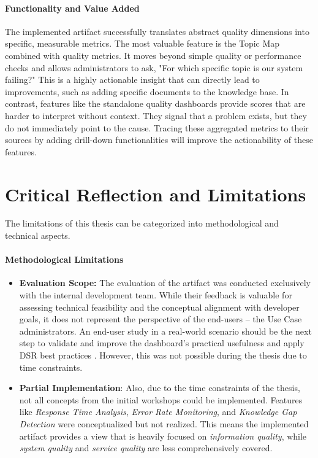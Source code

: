 \documentclass[
	english,
	ruledheaders=section,%
	class=report,%
	thesis={type=bachelor},%
	accentcolor=1b,%
	custommargins=true,%
	marginpar=false,%
	parskip=half-,%
	fontsize=11pt,%
	DIV=14,
]{tudapub}
\begin{document}
\paragraph{Functionality and Value Added} The implemented artifact successfully translates abstract quality dimensions into specific, measurable metrics. The most valuable feature is the Topic Map combined with quality metrics. It moves beyond simple quality or performance checks and allows administrators to ask, "For which specific topic is our system failing?" This is a highly actionable insight that can directly lead to improvements, such as adding specific documents to the knowledge base. In contrast, features like the standalone quality dashboards provide scores that are harder to interpret without context. They signal that a problem exists, but they do not immediately point to the cause. Tracing these aggregated metrics to their sources by adding drill-down functionalities will improve the actionability of these features.

\section{Critical Reflection and Limitations}
The limitations of this thesis can be categorized into methodological and technical aspects.

\paragraph{Methodological Limitations}
\begin{itemize}
    \item \textbf{Evaluation Scope:} The evaluation of the artifact was conducted exclusively with the internal development team. While their feedback is valuable for assessing technical feasibility and the conceptual alignment with developer goals, it does not represent the perspective of the end-users -- the Use Case administrators. An end-user study in a real-world scenario should be the next step to validate and improve the dashboard's practical usefulness and apply DSR best practices \parencite{Peffers2007}. However, this was not possible during the thesis due to time constraints.
    \item \textbf{Partial Implementation}: Also, due to the time constraints of the thesis, not all concepts from the initial workshops could be implemented. Features like \textit{Response Time Analysis}, \textit{Error Rate Monitoring}, and \textit{Knowledge Gap Detection} were conceptualized but not realized. This means the implemented artifact provides a view that is heavily focused on \textit{information quality}, while \textit{system quality} and \textit{service quality} are less comprehensively covered.
\end{itemize}
\end{document}
